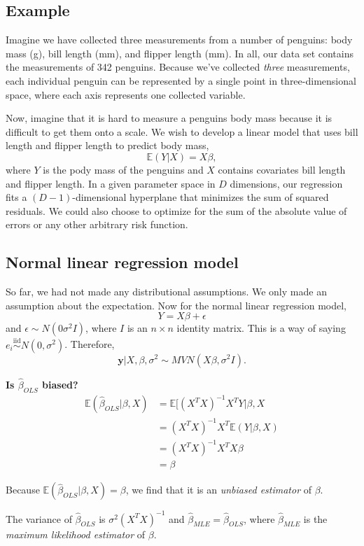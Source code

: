 \documentclass[titlepage, 12pt, leqno]{article}
\begin{document}
\subsection{Example}
Imagine we have collected three measurements from a number of penguins: body
mass (g), bill length (mm), and flipper length (mm). In all, our data set
contains the measurements of 342 penguins. Because we've collected \textit{three}
measurements, each individual penguin can be represented by a single point in
three-dimensional space, where each axis represents one collected variable.

Now, imagine that it is hard to measure a penguins body mass because it is
difficult to get them onto a scale. We wish to develop a linear model that uses
bill length and flipper length to predict body mass,
\[
\mathbb{E}(Y|X) = X\beta,
\]
where $Y$ is the pody mass of the penguins and $X$ contains covariates bill 
length and flipper length. In a given parameter space in $D$ dimensions, our
regression fits a $(D-1)$-dimensional hyperplane that minimizes the sum of
squared residuals. We could also choose to optimize for the sum of the
absolute value of errors or any other arbitrary risk function.

\subsection{Normal linear regression model}
So far, we had not made any distributional assumptions. We only made an 
assumption about the expectation. Now for the normal linear regression model,
\[
Y = X\beta + \epsilon
\]
and $\epsilon \sim N(0 \sigma^{2}I)$, where $I$ is an $n \times n$ identity
matrix. This is a way of saying $e_{i} \overset{\mathrm{iid}}{\sim}N(0,
\sigma^{2})$. Therefore,
\[
\textbf{y}|X,\beta,\sigma^{2} \sim  MVN(X\beta,\sigma^{2}I).
\]
\begin{ex}
    \textbf{Is $\hat \beta_{OLS}$ biased?}
    \vspace{10px}
    \begin{align*}
        \mathbb{E}(\hat \beta_{OLS}|\beta,X) &= \mathbb{E}[(X^{T}X)^{-1}X^{T}Y
            |\beta,X\\
                                    &= (X^{T}X)^{-1}X^{T}\mathbb{E}(Y|\beta,X)\\
                                    &= (X^{T}X)^{-1}X^{T}X\beta\\
                                    &= \beta
    \end{align*}
    
    Because $\mathbb{E}(\hat \beta_{OLS}|\beta,X) = \beta$, we find that it is
    an \textit{unbiased estimator} of $\beta$.
\end{ex}
\begin{note}
    The variance of $\hat \beta_{OLS}$ is $\sigma^{2}(X^{T}X)^{-1}$ and
    $\hat \beta_{MLE} = \hat \beta_{OLS}$, where $\hat \beta_{MLE}$ is the
    \textit{maximum likelihood estimator} of $\beta$.
\end{note}
\end{document}
